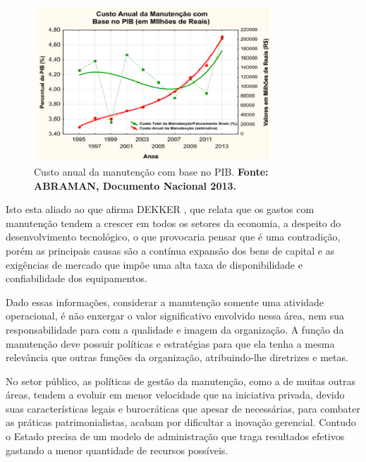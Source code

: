 \graphicspath{{figuras/}}
\begin{figure}[h]
\centering
\includegraphics[width=0.8\textwidth]{dados_pib_pesquisa_intro.eps}
\caption{Custo anual da manutenção com base no PIB. \textbf{Fonte: ABRAMAN, Documento Nacional 2013.}}
\label{custo_anual_2013}
\end{figure}


Isto esta aliado ao que afirma DEKKER \cite{dekker1998}, que relata que os gastos com manutenção tendem a crescer em todos os setores da economia, a despeito do desenvolvimento tecnológico, o que provocaria pensar que é uma contradição, porém as principais causas são a contínua expansão dos bens de capital e as exigências de mercado que impõe uma alta taxa de disponibilidade e confiabilidade dos equipamentos.

Dado essas informações, considerar a manutenção somente uma atividade operacional, é não enxergar o valor significativo envolvido nessa área, nem sua responsabilidade para com a qualidade e imagem da organização. A função da manutenção deve possuir políticas e estratégias para que ela tenha a mesma relevância que outras funções da organização, atribuindo-lhe diretrizes e metas.	

No setor público, as políticas de gestão da manutenção, como a de muitas outras áreas, tendem a evoluir em menor velocidade que na iniciativa privada, devido suas características legais e burocráticas que apesar de necessárias, para combater as práticas patrimonialistas, acabam por dificultar a inovação gerencial. Contudo o Estado precisa de um modelo de administração que traga resultados efetivos gastando a menor quantidade de recursos possíveis.


